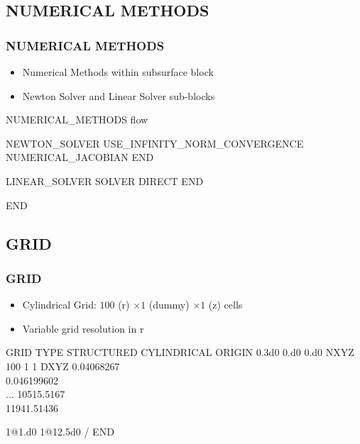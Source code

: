 \documentclass{beamer}
\begin{document}
\subsection{NUMERICAL METHODS}
\begin{frame}[fragile]\frametitle{NUMERICAL METHODS}

\begin{itemize}
  \item Numerical Methods within subsurface block
  \item Newton Solver and Linear Solver sub-blocks
\end{itemize}

\begin{semiverbatim}
NUMERICAL_METHODS flow

  NEWTON_SOLVER
    USE_INFINITY_NORM_CONVERGENCE
    NUMERICAL_JACOBIAN
  END

  LINEAR_SOLVER
    SOLVER DIRECT
  END

END
\end{semiverbatim}
\end{frame}
\subsection{GRID}
\begin{frame}\frametitle{GRID}

\begin{itemize}
  \item Cylindrical Grid: $100$ (r) $\times 1 $ (dummy) $\times 1$ (z) cells
  \item Variable grid resolution in r
\end{itemize}

\begin{semiverbatim}
GRID
  TYPE STRUCTURED CYLINDRICAL
  ORIGIN 0.3d0 0.d0 0.d0
  NXYZ 100 1 1
  DXYZ
    0.04068267 \\
    0.046199602 \\
    ...
    10515.5167 \\
    11941.51436

    1@1.d0
    1@12.5d0
  /
END
\end{semiverbatim}

\end{frame}
\end{document}
